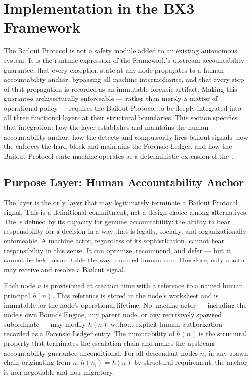 \section{Implementation in the BX3 Framework}
\label{sec:bailout-implementation}

The Bailout Protocol is not a safety module added to an existing autonomous system. It is the runtime expression of the \bxthree{} Framework's upstream accountability guarantee: that every exception state at any node propagates to a human accountability anchor, bypassing all machine intermediaries, and that every step of that propagation is recorded as an immutable forensic artifact. Making this guarantee architecturally enforceable — rather than merely a matter of operational policy — requires the Bailout Protocol to be deeply integrated into all three functional layers at their structural boundaries. This section specifies that integration: how the \purpose{} layer establishes and maintains the human accountability anchor, how the \bounds{} detects and compulsorily fires bailout signals, how the \fact{} enforces the hard block and maintains the Forensic Ledger, and how the Bailout Protocol state machine operates as a deterministic extension of the \fact{}.

\subsection{Purpose Layer: Human Accountability Anchor}
\label{sec:purpose-anchor}

The \purpose{} layer is the only layer that may legitimately terminate a Bailout Protocol signal. This is a definitional commitment, not a design choice among alternatives. The \purpose{} is defined by its capacity for genuine accountability: the ability to bear responsibility for a decision in a way that is legally, socially, and organizationally enforceable. A machine actor, regardless of its sophistication, cannot bear responsibility in this sense. It can optimize, recommend, and defer — but it cannot be held accountable the way a named human can. Therefore, only a \purpose{} actor may receive and resolve a Bailout signal.

Each \bxthree{} node $n$ is provisioned at creation time with a reference to a named human principal $h(n)$. This reference is stored in the node's \purpose{} worksheet and is immutable for the node's operational lifetime. No machine actor — including the node's own Bounds Engine, any parent node, or any recursively spawned subordinate — may modify $h(n)$ without explicit human authorization recorded as a Forensic Ledger entry. The immutability of $h(n)$ is the structural property that terminates the escalation chain and makes the upstream accountability guarantee unconditional. For all descendant nodes $n_i$ in any spawn chain originating from $n$, $h(n_i) = h(n)$ by structural requirement; the anchor is non-negotiable and non-migratory.

